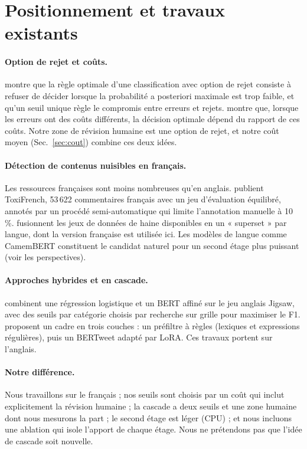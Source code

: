 \documentclass[a4paper,fleqn]{cas-sc}
\begin{document}
\section{Positionnement et travaux existants}

\paragraph{Option de rejet et coûts.}
\citet{Chow1970} montre que la règle optimale d'une classification avec option de rejet consiste à
refuser de décider lorsque la probabilité a posteriori maximale est trop faible, et qu'un seuil unique
règle le compromis entre erreurs et rejets. \citet{Elkan2001} montre que, lorsque les erreurs ont des
coûts différents, la décision optimale dépend du rapport de ces coûts. Notre zone de révision humaine est
une option de rejet, et notre coût moyen (Sec.~\ref{sec:cout}) combine ces deux idées.

\paragraph{Détection de contenus nuisibles en français.}
Les ressources françaises sont moins nombreuses qu'en anglais. \citet{Delaval2025} publient
ToxiFrench, 53\,622 commentaires français avec un jeu d'évaluation équilibré, annotés par un procédé
semi-automatique qui limite l'annotation manuelle à 10\,\%. \citet{Tonneau2024} fusionnent les jeux de
données de haine disponibles en un « superset » par langue, dont la version française est utilisée ici.
Les modèles de langue comme CamemBERT \citep{Martin2020} constituent le candidat naturel pour un
second étage plus puissant (voir les perspectives).

\paragraph{Approches hybrides et en cascade.}
\citet{Kumar2025} combinent une régression logistique et un BERT affiné sur le jeu anglais Jigsaw, avec
des seuils par catégorie choisis par recherche sur grille pour maximiser le F1.
\citet{ElBahnasawi2025} proposent un cadre en trois couches : un préfiltre à règles (lexiques et
expressions régulières), puis un BERTweet adapté par LoRA. Ces travaux portent sur l'anglais.

\paragraph{Notre différence.} Nous travaillons sur le français ; nos seuils sont choisis par un coût qui
inclut explicitement la révision humaine ; la cascade a deux seuils et une zone humaine dont nous
mesurons la part ; le second étage est léger (CPU) ; et nous incluons une ablation qui isole l'apport de
chaque étage. Nous ne prétendons pas que l'idée de cascade soit nouvelle.
\end{document}
